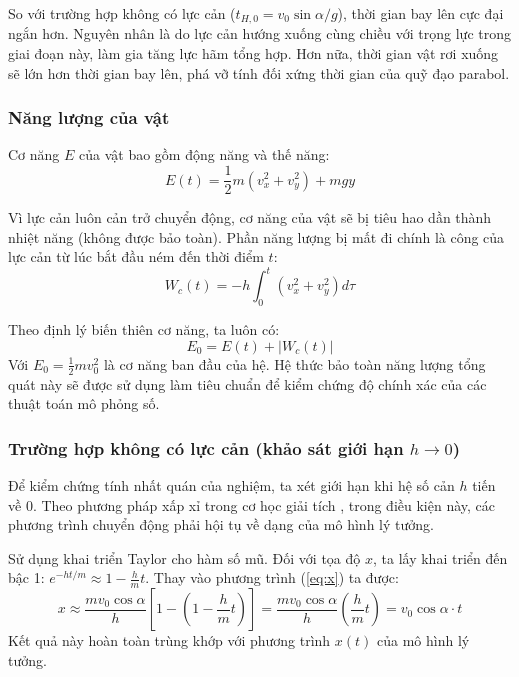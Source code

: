 So với trường hợp không có lực cản ($t_{H,0} = v_0\sin\alpha / g$), thời gian bay lên cực đại ngắn hơn. Nguyên nhân là do lực cản hướng xuống cùng chiều với trọng lực trong giai đoạn này, làm gia tăng lực hãm tổng hợp. Hơn nữa, thời gian vật rơi xuống sẽ lớn hơn thời gian bay lên, phá vỡ tính đối xứng thời gian của quỹ đạo parabol.

\subsubsection{Năng lượng của vật}
Cơ năng $E$ của vật bao gồm động năng và thế năng:
$$E(t) = \frac{1}{2}m\left(v_x^2 + v_y^2\right) + mgy$$

Vì lực cản luôn cản trở chuyển động, cơ năng của vật sẽ bị tiêu hao dần thành nhiệt năng (không được bảo toàn). Phần năng lượng bị mất đi chính là công của lực cản từ lúc bắt đầu ném đến thời điểm $t$:
\begin{equation}
W_{c}(t) = -h\int_0^t \left(v_x^2 + v_y^2\right) d\tau
\label{eq:work_drag}
\end{equation}

Theo định lý biến thiên cơ năng, ta luôn có:
\begin{equation}
E_0 = E(t) + |W_c(t)|
\label{eq:energy_conservation}
\end{equation}
Với $E_0 = \frac{1}{2}mv_0^2$ là cơ năng ban đầu của hệ. Hệ thức bảo toàn năng lượng tổng quát này sẽ được sử dụng làm tiêu chuẩn để kiểm chứng độ chính xác của các thuật toán mô phỏng số.

\subsubsection{Trường hợp không có lực cản (khảo sát giới hạn $h \to 0$)}
Để kiểm chứng tính nhất quán của nghiệm, ta xét giới hạn khi hệ số cản $h$ tiến về 0. Theo phương pháp xấp xỉ trong cơ học giải tích \cite{taylor2005classical}, trong điều kiện này, các phương trình chuyển động phải hội tụ về dạng của mô hình lý tưởng. 

Sử dụng khai triển Taylor cho hàm số mũ. Đối với tọa độ $x$, ta lấy khai triển đến bậc 1: $e^{-ht/m} \approx 1 - \frac{h}{m}t$. Thay vào phương trình (\ref{eq:x}) ta được:
\begin{equation*}
x \approx \frac{mv_0\cos\alpha}{h} \left[ 1 - \left(1 - \frac{h}{m}t\right) \right] = \frac{mv_0\cos\alpha}{h} \left( \frac{h}{m}t \right) = v_0\cos\alpha\cdot t
\end{equation*}
Kết quả này hoàn toàn trùng khớp với phương trình $x(t)$ của mô hình lý tưởng.

